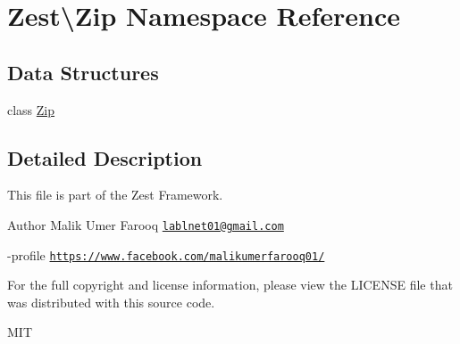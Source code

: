 \hypertarget{namespace_zest_1_1_zip}{}\section{Zest\textbackslash{}Zip Namespace Reference}
\label{namespace_zest_1_1_zip}
\subsection*{Data Structures}
\begin{DoxyCompactItemize}
\item 
class \mbox{\hyperlink{class_zest_1_1_zip_1_1_zip}{Zip}}
\end{DoxyCompactItemize}


\subsection{Detailed Description}
This file is part of the Zest Framework.

\begin{DoxyAuthor}{Author}
Malik Umer Farooq \href{mailto:lablnet01@gmail.com}{\tt lablnet01@gmail.\+com} 

-\/profile \href{https://www.facebook.com/malikumerfarooq01/}{\tt https\+://www.\+facebook.\+com/malikumerfarooq01/}
\end{DoxyAuthor}
For the full copyright and license information, please view the L\+I\+C\+E\+N\+SE file that was distributed with this source code.

M\+IT 